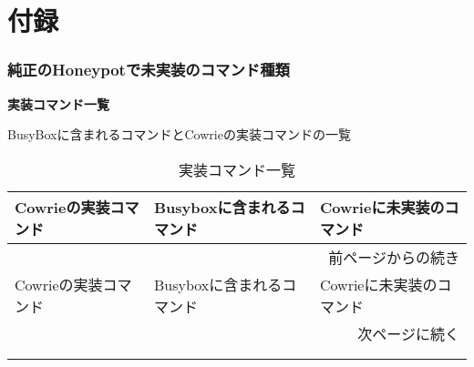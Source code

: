 \appendix
\chapter{付録}
\label{appd}


\subsection{純正のHoneypotで未実装のコマンド種類}
\label{appd:kindofcommand}

\begin{center}
\large{\textbf{実装コマンド一覧}}
\end{center}

BusyBoxに含まれるコマンドとCowrieの実装コマンドの一覧
 
\begin{longtable}{llp{50mm}}
  \caption{実装コマンド一覧}
  \label{table:command} \\
  \hline
  Cowrieの実装コマンド & Busyboxに含まれるコマンド & Cowrieに未実装のコマンド \\ \hline\hline
  \endfirsthead
  \multicolumn{3}{r}{前ページからの続き} \\ \hline
  Cowrieの実装コマンド　& Busyboxに含まれるコマンド & Cowrieに未実装のコマンド \\ \hline\hline
  \endhead
  \hline
  \multicolumn{3}{r}{次ページに続く} \\
  \endfoot
  \hline
  \multicolumn{3}{r}{以上} \\
  \endlastfoot


\end{longtable}

